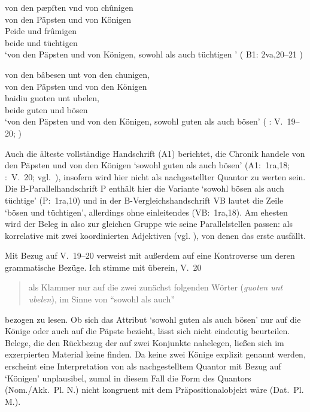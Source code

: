 \begin{exe}
\ex \begin{xlist}
	\ex \label{ex:kcexcl1}
		\gll von den pæpſten vnd von chûnigen \\
			von den Päpsten und von Königen \\
	\sn \gll Peide und frûmigen \\
			beide und tüchtigen \\
		\trans `von den Päpsten und von Königen, sowohl als auch tüchtigen
			'
			(%
				B1: 2va,20--21%
			)

	\ex \label{ex:kcexcl1_schroeder}
		\gll von den bâbesen unt von den chunigen, \\
			von den Päpsten und von den Königen \\
	\sn \gll baidiu guoten unt ubelen, \\
			beide guten und bösen \\
		\trans `von den Päpsten und von den Königen, sowohl guten als auch
			bösen'
			(%
				\KC: V.~19--20;
				\cite[79]{schroeder1895}%
			)
\end{xlist}
\end{exe}

Auch die älteste vollständige Handschrift (A1) berichtet, die Chronik handele
von den Päpsten und von den Königen  `sowohl guten
als auch bösen' (A1:~1ra,18; \KC:~V.~20; vgl.~\cite[79]{schroeder1895}),
insofern wird  hier nicht als nachgestellter Quantor zu werten
sein. Die B-\allowbreak{}Pa\-ral\-lel\-hand\-schrift P enthält hier die
Variante  `sowohl bösen als auch
tüchtige' (P:~1ra,10) und in der B-Vergleichshandschrift VB lautet
die Zeile  `bösen und tüchtigen', allerdings ohne
einleitendes  (VB:~1ra,18). Am ehesten wird der Beleg in
 also zur gleichen Gruppe wie seine Parallelstellen passen:
 als korrelative  mit zwei koordinierten
Adjektiven (vgl. ), von
denen das erste ausfällt.

Mit Bezug auf V.~19--20 verweist \citet[26, Fußnote 45]{weis2022} mit
\citet[55, Fußnote 87]{dickhutbielsky2015} außerdem auf eine Kontroverse um
deren grammatische Bezüge. Ich stimme mit \citet[239]{haupt2019} überein, V.~20
\blockquote{als Klammer nur auf die zwei zunächst folgenden Wörter
(\textit{guoten unt ubelen}), im Sinne von \enquote{sowohl als auch}} bezogen
zu lesen. Ob sich das Attribut 
`sowohl guten als auch bösen' nur auf die Könige oder auch auf die Päpste
bezieht, lässt sich nicht eindeutig beurteilen. Belege, die den
Rückbezug der   auf zwei Konjunkte nahelegen,
ließen sich im exzerpierten Material keine finden. Da keine zwei Könige
explizit genannt werden, erscheint eine Interpretation von  als
nachgestelltem Quantor mit Bezug auf  `Königen' unplausibel,
zumal in diesem Fall die Form des Quantors (Nom./Akk.~Pl. N.) nicht kongruent
mit dem Präpositionalobjekt wäre (Dat.~Pl. M.).

